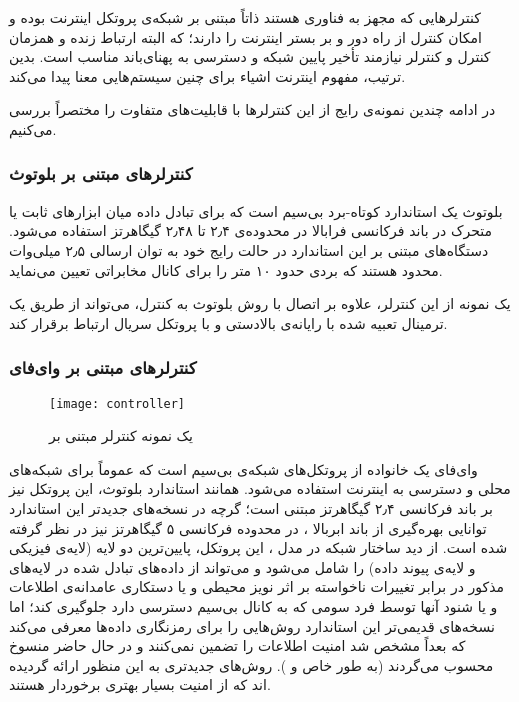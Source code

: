 \documentclass[12pt,twocolumn,a4paper,oneside]{article}
\begin{document}
کنترلرهایی که مجهز به فناوری  هستند ذاتاً مبتنی بر شبکه‌ی پروتکل اینترنت بوده و امکان کنترل از راه دور و بر بستر اینترنت را دارند؛ که البته ارتباط زنده و همزمان کنترل و کنترلر نیازمند تأخیر پایین شبکه و دسترسی به پهنای‌باند مناسب است. بدین ترتیب، مفهوم اینترنت اشیاء برای چنین سیستم‌هایی معنا پیدا می‌کند.

در ادامه چندین نمونه‌ی رایج از این کنترلرها با قابلیت‌های متفاوت را مختصراً بررسی می‌کنیم.

\subsubsection{کنترلرهای مبتنی بر بلوتوث}
بلوتوث یک استاندارد کوتاه-برد بی‌سیم است که برای تبادل داده میان ابزارهای ثابت یا متحرک در باند فرکانسی فرابالا
در محدوده‌ی ۲٫۴ تا ۲٫۴۸ گیگاهرتز استفاده می‌شود\cite{bluetooth-freq}. دستگاه‌های مبتنی بر این استاندارد در حالت رایج خود به توان ارسالی ۲٫۵ میلی‌وات محدود هستند که بردی حدود ۱۰ متر را برای کانال مخابراتی تعیین می‌نماید\cite{bluetooth-range}.

یک نمونه از این کنترلر، علاوه بر اتصال با روش بلوتوث به کنترل، می‌تواند از طریق یک ترمینال تعبیه شده با رایانه‌ی بالادستی و با پروتکل سریال ارتباط برقرار کند\cite{patent:CN103987158A}.

\subsubsection{کنترلرهای مبتنی بر وای‌فای}

\begin{figure}[ht]
\centering
\texttt{[image: controller]}
\caption{یک نمونه کنترلر مبتنی بر \cite{amzn:B07DDB6JHJ}}
\label{fig:controller}
\end{figure}

وای‌فای یک خانواده از پروتکل‌های شبکه‌ی بی‌سیم است که عموماً برای شبکه‌های محلی و دسترسی به اینترنت استفاده می‌شود. همانند استاندارد بلوتوث، این پروتکل نیز بر باند فرکانسی ۲٫۴ گیگاهرتز مبتنی است؛ گرچه در نسخه‌های جدیدتر این استاندارد توانایی بهره‌گیری از باند ابربالا
،
در محدوده فرکانسی ۵ گیگاهرتز نیز در نظر گرفته شده است. از دید ساختار شبکه در مدل
،
این پروتکل، پایین‌ترین دو لایه (لایه‌ی فیزیکی و لایه‌ی پیوند داده) را شامل می‌شود و می‌تواند از داده‌های تبادل شده در لایه‌های مذکور در برابر تغییرات نا‌خواسته بر اثر نویز محیطی و یا دستکاری عامدانه‌ی اطلاعات و یا شنود آنها توسط فرد سومی که به کانال بی‌سیم دسترسی دارد جلوگیری کند؛ اما نسخه‌های قدیمی‌تر این استاندارد روش‌هایی را برای رمزنگاری داده‌ها معرفی می‌کند که بعداً مشخص شد امنیت اطلاعات را تضمین نمی‌کنند و در حال حاضر منسوخ محسوب می‌گردند (به طور خاص
و
).
روش‌های جدیدتری به این منظور ارائه گردیده اند که از امنیت بسیار بهتری برخوردار هستند\cite{wi-fi}.
\end{document}
